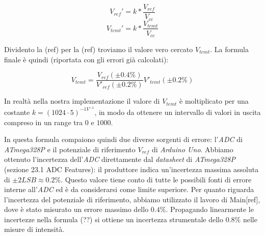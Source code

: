 \documentclass[12pt, a4paper, twoside]{article}
\begin{document}
    \vspace{-10mm}
    \begin{multicols}{2}
      \begin{equation}
        V_{ref}' = k * \frac {V_{ref}} {V_{cc}}
      \end{equation}
    \break
      \begin{equation}
        V_{temt}' = k * \frac {V_{temt}} {V_{cc}}
      \end{equation}
    \end{multicols}

    \noindent Dividento la (ref) per la (ref) troviamo il valore vero cercato $V_{temt}$.%
    La formula finale è quindi (riportata con gli errori già calcolati):

    \begin{equation}
      V_{temt} = \frac {
        V_{ref} (\pm 0.4\%)
      } {
        V'_{ref} (\pm 0.2\%)
      } V'_{temt} (\pm 0.2\%)
      \label{eq:misura-intensità}
    \end{equation}

    \noindent In realtà nella nostra implementazione il valore di $V_{temt}$ è
    moltiplicato per una costante $k = (1024 \cdot 5)^{-1 V^{-1}}$, in modo
    da ottenere un intervallo di valori in uscita compreso in un range tra $0$ e
    $1000$. %

    In questa formula compaiono quindi due diverse sorgenti di errore:
    l'\emph{ADC} di \emph{ATmega328P} e il potenziale di riferimento $V_{ref}$
    di \emph{Arduino Uno}.
    Abbiamo ottenuto l’incertezza dell’\emph{ADC} direttamente dal
    \emph{datasheet} di \emph{ATmega328P} (sezione 23.1 ADC  Features): %
    il produttore indica un'incertezza massima assoluta di $\pm 2LSB \approx 0.2\%$. %
    Questo valore tiene conto di tutte le possibili fonti di errore interne
    all’\emph{ADC} ed è da considerarsi come limite superiore.
    Per quanto riguarda l'incertezza del potenziale di riferimento, abbiamo
    utilizzato il lavoro di Main[ref], dove è stato misurato un errore %
    massimo dello $0.4\%$.
    Propagando linearmente le incertezze nella formula (??) si ottiene un incertezza
    strumentale dello $0.8\%$ nelle misure di intensità.
\end{document}
